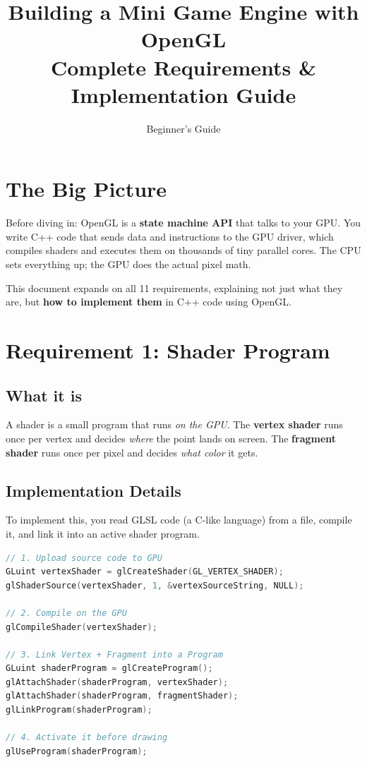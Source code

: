 \documentclass[12pt,a4paper]{article}
\title{\textbf{Building a Mini Game Engine with OpenGL}\\ \large Complete Requirements \& Implementation Guide}
\author{Beginner's Guide}
\date{}
\begin{document}
\maketitle

\tableofcontents
\newpage

\section*{The Big Picture}
Before diving in: OpenGL is a \textbf{state machine API} that talks to your GPU. You write C++ code that sends data and instructions to the GPU driver, which compiles shaders and executes them on thousands of tiny parallel cores. The CPU sets everything up; the GPU does the actual pixel math.

\vspace{1em}
This document expands on all 11 requirements, explaining not just what they are, but \textbf{how to implement them} in C++ code using OpenGL.

\section{Requirement 1: Shader Program}

\subsection*{What it is}
A shader is a small program that runs \textit{on the GPU}. The \textbf{vertex shader} runs once per vertex and decides \textit{where} the point lands on screen. The \textbf{fragment shader} runs once per pixel and decides \textit{what color} it gets.

\subsection*{Implementation Details}
To implement this, you read GLSL code (a C-like language) from a file, compile it, and link it into an active shader program.

\begin{lstlisting}[language=C++]
// 1. Upload source code to GPU
GLuint vertexShader = glCreateShader(GL_VERTEX_SHADER);
glShaderSource(vertexShader, 1, &vertexSourceString, NULL);

// 2. Compile on the GPU
glCompileShader(vertexShader);

// 3. Link Vertex + Fragment into a Program
GLuint shaderProgram = glCreateProgram();
glAttachShader(shaderProgram, vertexShader);
glAttachShader(shaderProgram, fragmentShader);
glLinkProgram(shaderProgram);

// 4. Activate it before drawing
glUseProgram(shaderProgram);
\end{lstlisting}
\end{document}
